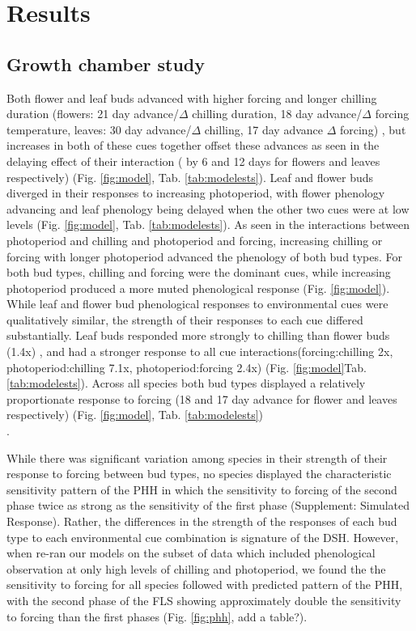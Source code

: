 \documentclass[11pt]{article}
\begin{document}
\section*{Results}
\subsection*{Growth chamber study}
\noindent  Both flower and leaf buds advanced with higher forcing and longer chilling duration (flowers: 21 day advance/$\Delta$ chilling duration, 18 day advance/$\Delta$ forcing temperature, leaves: 30 day advance/$\Delta$ chilling, 17 day advance $\Delta$ forcing) , but increases in both of these cues together offset these advances as seen in the delaying effect of their interaction ( by 6 and 12 days for flowers and leaves respectively) (Fig. \ref{fig:model}, Tab. \ref{tab:modelests}). Leaf and flower buds diverged in their responses to increasing photoperiod, with flower phenology advancing and leaf phenology being delayed when the other two cues were at low levels (Fig. \ref{fig:model}, Tab. \ref{tab:modelests}). As seen in the interactions between photoperiod and chilling and photoperiod and forcing, increasing chilling or forcing with longer photoperiod advanced the phenology of both bud types. For both bud types, chilling and forcing were the dominant cues, while increasing photoperiod produced a more muted phenological response (Fig. \ref{fig:model}). \\

\noindent While leaf and flower bud phenological responses to environmental cues were qualitatively similar, the strength of their responses to each cue differed substantially. Leaf buds responded more strongly to chilling than flower buds (1.4x) , and had a stronger response to all cue interactions(forcing:chilling 2x, photoperiod:chilling 7.1x, photoperiod:forcing 2.4x) (Fig. \ref{fig:model}Tab. \ref{tab:modelests}). Across all species both bud types displayed a relatively proportionate response to forcing (18 and 17 day advance for flower and leaves respectively) (Fig. \ref{fig:model}, Tab. \ref{tab:modelests})\\. 

\noindent While there was significant variation among species in their strength of their response to forcing between bud types, no species displayed the characteristic sensitivity pattern of the PHH in which the sensitivity to forcing of the second phase twice as strong as the sensitivity of the first phase (Supplement: Simulated Response). Rather, the differences in the strength of the responses of each bud type to each environmental cue combination is signature of the DSH. However, when re-ran our models on the subset of data which included phenological observation at only high levels of chilling and photoperiod, we found the the sensitivity to forcing for all species followed with predicted pattern of the PHH, with the second phase of the FLS showing approximately double the sensitivity to forcing than the first phases (Fig. \ref{fig:phh}, add a table?).\\ 
\end{document}
